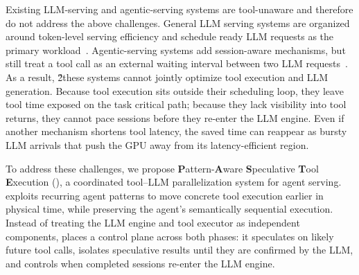 Existing LLM-serving and agentic-serving systems are tool-unaware and therefore do not address the above challenges. General LLM serving systems are organized around token-level serving efficiency and schedule ready LLM requests as the primary workload~\cite{kwon2023efficient, agrawal2024sarathiserve, duan2024muxserve, qiao2024conserve}. Agentic-serving systems add session-aware mechanisms, but still treat a tool call as an external waiting interval between two LLM requests~\cite{abhyankar2024infercept, wang2025augserve, pan2025kvflow, xie2025strata, li2025throughput}. As a result, \v2{these systems cannot jointly optimize tool execution and LLM generation.} Because tool execution sits outside their scheduling loop, they leave tool time exposed on the task critical path; because they lack visibility into tool returns, they cannot pace sessions before they re-enter the LLM engine. Even if another mechanism shortens tool latency, the saved time can reappear as bursty LLM arrivals that push the GPU away from its latency-efficient region.




To address these challenges, we propose \textbf{P}attern-\textbf{A}ware \textbf{S}peculative \textbf{T}ool \textbf{E}xecution (\textbf{\sys}), a coordinated tool--LLM parallelization system for agent serving. \sys exploits recurring agent patterns to move concrete tool execution earlier in physical time, while preserving the agent's semantically sequential execution. Instead of treating the LLM engine and tool executor as independent components, \sys places a control plane across both phases: it speculates on likely future tool calls, isolates speculative results until they are confirmed by the LLM, and controls when completed sessions re-enter the LLM engine.


